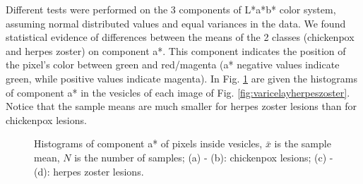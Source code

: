 \documentclass[oribibl]{llncs}
\begin{document}
Different tests were performed on the 3 components of L*a*b* color system, assuming normal distributed values and equal variances in the data. We found statistical evidence of differences between the means of the 2 classes (chickenpox and herpes zoster) on component a*. This component indicates the position of the pixel's color between green and red/magenta (a* negative values indicate green, while positive values indicate magenta). 
In Fig. \ref{fig:histogramas} are given the histograms of component a* in the vesicles of each image of Fig. \ref{fig:varicelayherpeszoster}. 
Notice that the sample means are much smaller for herpes zoster lesions than for chickenpox lesions.

\begin{figure}
\centering 
{}%
\caption{Histograms of component a* of pixels inside vesicles, $\bar{x}$ is the sample mean, $N$ is the number of samples; (a) - (b): chickenpox lesions; (c) - (d): herpes zoster lesions.\label{fig:histogramas}}
\end{figure}
\end{document}
